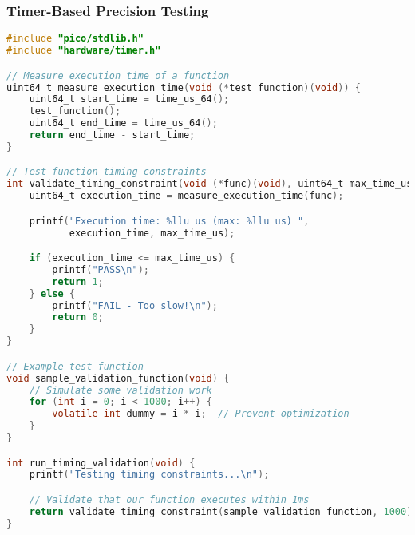 \documentclass{beamer}
\begin{document}
\begin{frame}[fragile]
\frametitle{Timer-Based Precision Testing}
\begin{lstlisting}[language=C]
#include "pico/stdlib.h"
#include "hardware/timer.h"

// Measure execution time of a function
uint64_t measure_execution_time(void (*test_function)(void)) {
    uint64_t start_time = time_us_64();
    test_function();
    uint64_t end_time = time_us_64();
    return end_time - start_time;
}

// Test function timing constraints
int validate_timing_constraint(void (*func)(void), uint64_t max_time_us) {
    uint64_t execution_time = measure_execution_time(func);

    printf("Execution time: %llu us (max: %llu us) ",
           execution_time, max_time_us);

    if (execution_time <= max_time_us) {
        printf("PASS\n");
        return 1;
    } else {
        printf("FAIL - Too slow!\n");
        return 0;
    }
}

// Example test function
void sample_validation_function(void) {
    // Simulate some validation work
    for (int i = 0; i < 1000; i++) {
        volatile int dummy = i * i;  // Prevent optimization
    }
}

int run_timing_validation(void) {
    printf("Testing timing constraints...\n");

    // Validate that our function executes within 1ms
    return validate_timing_constraint(sample_validation_function, 1000);
}
\end{lstlisting}
\end{frame}
\end{document}
